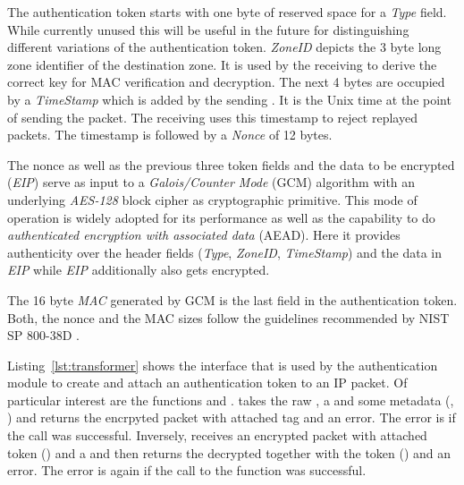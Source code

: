 The authentication token starts with one byte of reserved space for a \textit{Type} field. While
currently unused this will be useful in the future for distinguishing different variations of
the authentication token. \textit{ZoneID} depicts the 3 byte long zone identifier of the
destination zone. It is used by the receiving \tp to derive the correct key for MAC verification
and decryption. The next 4 bytes are occupied by a \textit{TimeStamp} which is added by the
sending \tp. It is the Unix time at the point of sending the packet. The receiving \tp uses this
timestamp to reject replayed packets. The timestamp is followed by a \textit{Nonce} of 12 bytes.

The nonce as well as the previous three token fields and the data to be encrypted (\textit{EIP})
serve as input to a \textit{Galois/Counter Mode} (GCM) algorithm with an underlying
\textit{AES-128} block cipher as cryptographic primitive. This mode of operation is widely
adopted for its performance as well as the capability to do \textit{authenticated encryption
	with associated data} (AEAD). Here it provides authenticity over the header fields
(\textit{Type}, \textit{ZoneID}, \textit{TimeStamp}) and the data in \textit{EIP} while
\textit{EIP} additionally also gets encrypted.

The 16 byte \textit{MAC} generated by GCM is the last field in the authentication token. Both,
the nonce and the MAC sizes follow the guidelines recommended by NIST SP 800-38D \cite{nistgcm}.

Listing~\ref{lst:transformer} shows the interface that is used by the authentication module
to create and attach an authentication token to an IP packet. Of particular interest are the
functions  and .  takes the raw
, a  and some metadata (, ) and returns the
encrpyted packet with attached tag and an error. The error is  if the
call was successful.
Inversely,  receives an encrypted packet with attached token () and
a  and then returns the decrypted  together with the token ()
and an error. The error is again  if the
call to the function was successful.

